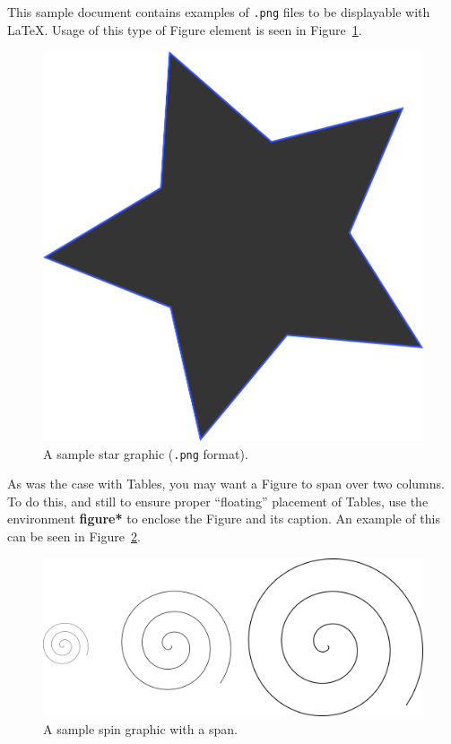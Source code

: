 \documentclass[article,english]{stucosrec}
\newcommand{\latex}{\LaTeX\xspace}
\begin{document}
	This sample document contains examples of \texttt{.png} files to be displayable with \latex.
	Usage of this type of Figure element is seen in Figure~\ref{fig:star}.
	
	\begin{figure}
		\centering
		\includegraphics[scale=0.5]{star.png}
		\caption{A sample star graphic (\texttt{.png} format).}
		\label{fig:star}
	\end{figure}

	As was the case with Tables, you may want a Figure to span over two columns.
	To do this, and still to ensure proper ``floating'' placement of Tables, use the environment \textbf{figure*} to enclose the Figure and its caption.
	An example of this can be seen in Figure~\ref{fig:spin}.
	
	\begin{figure}
		\centering
		\includegraphics[scale=0.8]{spin.png}
		\caption{A sample spin graphic with a span.}
		\label{fig:spin}
	\end{figure}
	
\end{document}
